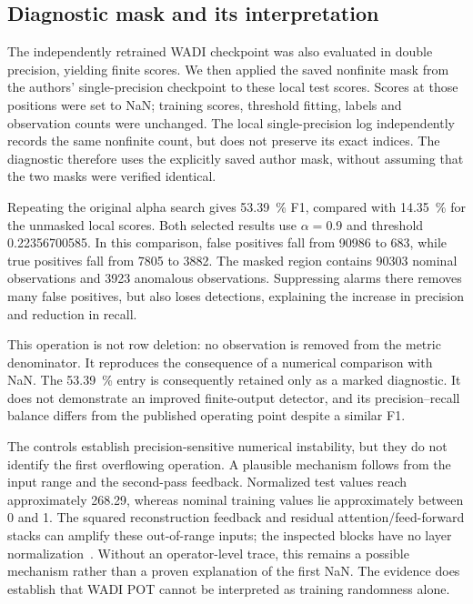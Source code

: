 \subsection{Diagnostic mask and its interpretation}
The independently retrained WADI checkpoint was also evaluated in double
precision, yielding finite scores. We then applied the saved nonfinite
mask from the authors' single-precision checkpoint to these local test
scores. Scores at those positions were set to NaN; training scores,
threshold fitting, labels and observation counts were unchanged. The
local single-precision log independently records the same nonfinite
count, but does not preserve its exact indices. The diagnostic therefore
uses the explicitly saved author mask, without assuming that the two
masks were verified identical.

Repeating the original alpha search gives \SI{53.39}{\percent} F1,
compared with \SI{14.35}{\percent} for the unmasked local scores. Both
selected results use \(\alpha=\num{0.9}\) and threshold
\num{0.22356700585}. In this comparison, false positives fall from
\num{90986} to \num{683}, while true positives fall from \num{7805} to
\num{3882}. The masked region contains \num{90303} nominal observations
and \num{3923} anomalous observations. Suppressing alarms there removes
many false positives, but also loses detections, explaining the increase
in precision and reduction in recall.

This operation is not row deletion: no observation is removed from the
metric denominator. It reproduces the consequence of a numerical
comparison with NaN. The \SI{53.39}{\percent} entry is consequently
retained only as a marked diagnostic. It does not demonstrate an improved
finite-output detector, and its precision--recall balance differs from
the published operating point despite a similar F1.

The controls establish precision-sensitive numerical instability, but
they do not identify the first overflowing operation. A plausible
mechanism follows from the input range and the second-pass feedback.
Normalized test values reach approximately \num{268.29}, whereas nominal
training values lie approximately between \num{0} and \num{1}.
The squared reconstruction feedback and residual attention/feed-forward
stacks can amplify these out-of-range inputs; the inspected blocks have
no layer normalization~\cite{TranADPlusReferenceCode}. Without an
operator-level trace, this remains a possible mechanism rather than a
proven explanation of the first NaN. The evidence does establish that
WADI \ac{POT} cannot be interpreted as training randomness alone.

